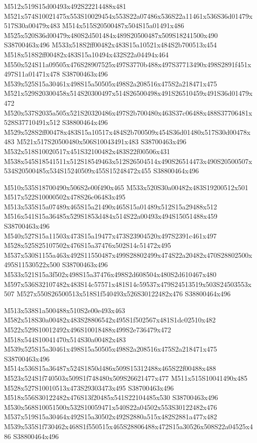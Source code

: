 \documentclass{article}
\begin{document}
\begin{multicols}{2}
M512x519S15d00493x492S22214488x481 M521x574S10021475x553S10029454x553S22a07486x536S22a11461x536S36d01479x517S30a00479x483 M514x515S20500487x504S15a01491x486 M525x520S36d00479x480S2d501484x489S20500487x509S18241500x490 S38700463x496 M533x518S2ff00482x483S15a10521x484S2b700513x454 M518x518S2ff00482x483S15a10494x432S22a04494x464 M550x524S11a09505x476S28907525x497S3770b488x497S37713490x498S2891f451x497S11a01471x478 S38700463x496 M539x525S15a30461x498S15a50505x498S2a208516x475S2a218471x475 M521x529S20300458x514S20300497x514S26500498x491S26510459x491S36d01479x472 M520x537S2035a505x521S20320486x497S2b700480x463S37c06488x488S37706481x528S37710491x512 S38800464x496 M529x528S2ff00478x483S15a10517x484S2b700509x454S36d01480x517S30d00478x483 M521x517S20500480x506S10043491x483 S38700463x496 M532x518S10020517x451S32100482x483S22f00506x431 M538x545S18541511x512S18549463x512S26504514x490S26514473x490S20500507x534S20500485x534S15240509x455S15248472x455 S38800464x496

M510x535S18700490x506S2e00f490x465 M533x520S30a00482x483S19200512x501 M517x522S10000502x478S26c06483x495 M513x535S15a07489x465S15a21490x465S15a01489x512S15a29488x512 M516x541S15a36485x529S1853d484x514S22a00493x494S15051488x459 S38700463x496 M540x527S15a11503x473S15a19477x473S23904520x497S2391c461x497 M528x525S25107502x476S15a37476x502S14c51472x495 M537x530S1155a463x492S11550487x499S28802499x474S22a20482x470S28802500x495S11530522x500 S38700463x496 M533x521S15a3f502x498S15a37476x498S2d608504x480S2d610467x480 M597x536S32107482x483S14c57571x481S14c59537x479S24513519x503S24503553x507 M527x550S26500513x518S1f540493x526S30122482x476 S38800464x496

M513x538S1a500488x510S2e00e493x463 M582x518S30a00482x483S28806542x495S1f502567x481S1dc02510x482 M522x529S10012492x496S10018488x499S2e736479x472 M518x544S10041470x514S30a00482x483 M539x525S15a30461x498S15a50505x498S2a208516x475S2a218471x475 S38700463x496 M514x536S15a36487x524S1850d486x509S15312488x465S22f00488x488 M523x524S1f740503x509S1f748480x509S26621477x477 M511x515S10041490x485 M528x527S10010513x473S29303473x495 S38700463x496 M518x556S30122482x476S13f20485x541S22104485x530 S38700463x496 M530x568S10051500x532S10059471x540S22a04502x553S30122482x476 M537x519S15a30464x492S15a30502x492S2880a515x482S2881a477x482 M539x535S1f730462x468S1f550515x465S28806488x472S15a30526x508S22a04525x486 S38800464x496


\end{multicols}
\end{document}
